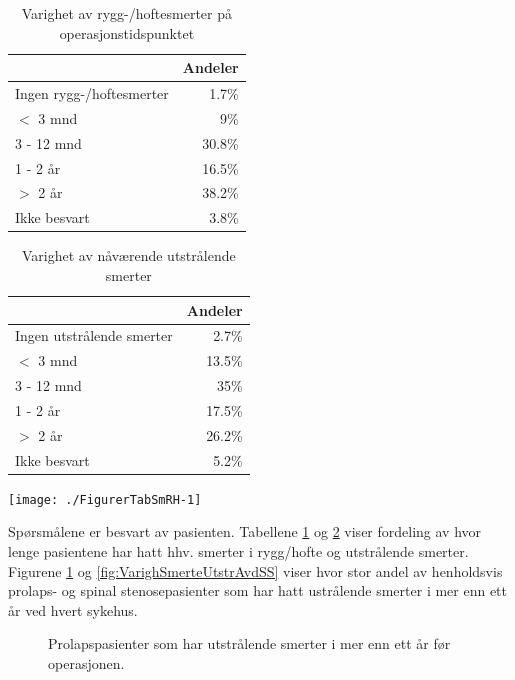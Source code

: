 \documentclass [norsk,a4paper,twoside]{article}\usepackage[]{graphicx}\usepackage[]{color}
\begin{document}
\begin{table}[ht]
\centering
\begin{tabular}{lr}
  \hline
 & Andeler \\ 
  \hline
Ingen rygg-/hoftesmerter & 1.7\% \\ 
  $<$ 3 mnd & 9\% \\ 
  3 - 12 mnd & 30.8\% \\ 
  1 - 2 år & 16.5\% \\ 
  $>$ 2 år & 38.2\% \\ 
  Ikke besvart & 3.8\% \\ 
   \hline
\end{tabular}
\caption{Varighet av rygg-/hoftesmerter på operasjonstidspunktet} 
\label{tab:SmRH}
\end{table}
\begin{table}[ht]
\centering
\begin{tabular}{lr}
  \hline
 & Andeler \\ 
  \hline
Ingen utstrålende smerter & 2.7\% \\ 
  $<$ 3 mnd & 13.5\% \\ 
  3 - 12 mnd & 35\% \\ 
  1 - 2 år & 17.5\% \\ 
  $>$ 2 år & 26.2\% \\ 
  Ikke besvart & 5.2\% \\ 
   \hline
\end{tabular}
\caption{Varighet av nåværende utstrålende smerter} 
\label{tab:Utstr}
\end{table}


{\centering \texttt{[image: ./FigurerTabSmRH-1]} 

}



Spørsmålene er besvart av pasienten.
Tabellene \ref{tab:SmRH}  og \ref{tab:Utstr} viser fordeling av hvor lenge pasientene har hatt 
hhv. smerter i rygg/hofte og utstrålende smerter. Figurene \ref{fig:VarighSmerteUtstrAvdPro} og \ref{fig:VarighSmerteUtstrAvdSS} viser hvor stor andel av henholdsvis prolaps- og spinal stenosepasienter som har hatt ustrålende smerter i mer enn ett år ved hvert sykehus. 

\begin{figure}[h] 
      \caption{Prolapspasienter som har utstrålende smerter i mer enn ett år før operasjonen.}
      \label{fig:VarighSmerteUtstrAvdPro}
\end{figure}
\end{document}
